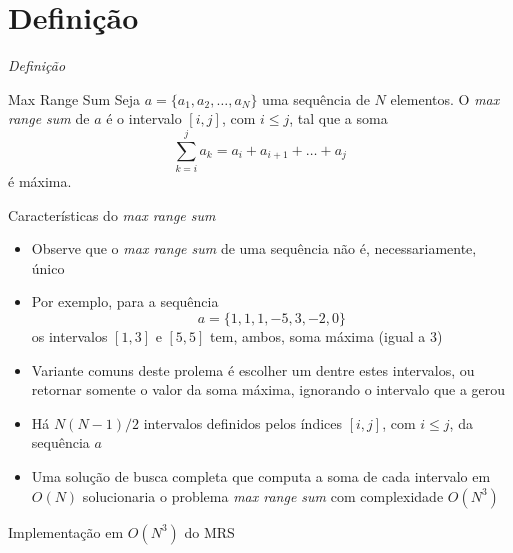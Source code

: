 \section{Definição}

\begin{frame}[fragile]{{\it Definição}}

    \begin{block}{Max Range Sum}
        Seja $a = \{a_1, a_2, \ldots, a_N\}$ uma sequência de $N$ elementos. O \textit{max range
            sum} de $a$ é o intervalo $[i, j]$, com $i \leq j$, tal que a soma
        \[
            \sum_{k = i}^j a_k = a_i + a_{i + 1} + \ldots + a_j
        \]
        é máxima.
    \end{block}

\end{frame}

\begin{frame}[fragile]{Características do {\it max range sum}}

    \begin{itemize}
        \item Observe que o \textit{max range sum} de uma sequência não é, necessariamente,
            único

        \item Por exemplo, para a sequência
        \[
            a = \{ 1, 1, 1, -5, 3, -2, 0 \}
        \]
        os intervalos $[1, 3]$ e $[5, 5]$ tem, ambos, soma máxima (igual a 3)

        \item Variante comuns deste prolema é  escolher um dentre estes intervalos, ou retornar
            somente o valor da soma máxima, ignorando o intervalo que a gerou

        \item Há $N(N - 1)/2$ intervalos definidos pelos índices $[i, j]$, com $i\leq j$, da sequência $a$

        \item Uma solução de busca completa que computa a soma de cada intervalo em $O(N)$
            solucionaria o problema \textit{max range sum} com complexidade $O(N^3)$

    \end{itemize}

\end{frame}

\begin{frame}[fragile]{Implementação em $O(N^3)$ do MRS}
\end{frame}

